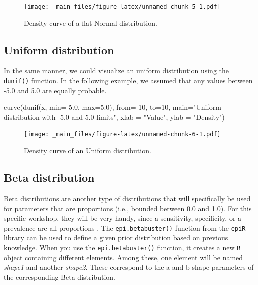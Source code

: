 \documentclass[
]{book}
\newenvironment{Shaded}{\begin{snugshade}}{\end{snugshade}}
\newcommand{\AttributeTok}[1]{\textcolor[rgb]{0.77,0.63,0.00}{#1}}
\newcommand{\DecValTok}[1]{\textcolor[rgb]{0.00,0.00,0.81}{#1}}
\newcommand{\FloatTok}[1]{\textcolor[rgb]{0.00,0.00,0.81}{#1}}
\newcommand{\FunctionTok}[1]{\textcolor[rgb]{0.00,0.00,0.00}{#1}}
\newcommand{\NormalTok}[1]{#1}
\newcommand{\SpecialCharTok}[1]{\textcolor[rgb]{0.00,0.00,0.00}{#1}}
\newcommand{\StringTok}[1]{\textcolor[rgb]{0.31,0.60,0.02}{#1}}
\begin{document}
\begin{figure}
\centering
\texttt{[image: \_main\_files/figure-latex/unnamed-chunk-5-1.pdf]}
\caption{Density curve of a flat Normal distribution.}
\end{figure}

\hypertarget{uniform-distribution}{%
\subsection{Uniform distribution}\label{uniform-distribution}}

In the same manner, we could visualize an uniform distribution using the
\texttt{dunif()} function. In the following example, we assumed that any
values between -5.0 and 5.0 are equally probable.

\begin{Shaded}
\begin{Highlighting}[]
\FunctionTok{curve}\NormalTok{(}\FunctionTok{dunif}\NormalTok{(x, }\AttributeTok{min=}\SpecialCharTok{{-}}\FloatTok{5.0}\NormalTok{, }\AttributeTok{max=}\FloatTok{5.0}\NormalTok{),                                    }
      \AttributeTok{from=}\SpecialCharTok{{-}}\DecValTok{10}\NormalTok{, }\AttributeTok{to=}\DecValTok{10}\NormalTok{,                                                 }
      \AttributeTok{main=}\StringTok{"Uniform distribution with {-}5.0 and 5.0 limits"}\NormalTok{,    }
      \AttributeTok{xlab =} \StringTok{"Value"}\NormalTok{, }\AttributeTok{ylab =} \StringTok{"Density"}\NormalTok{)                              }
\end{Highlighting}
\end{Shaded}

\begin{figure}
\centering
\texttt{[image: \_main\_files/figure-latex/unnamed-chunk-6-1.pdf]}
\caption{Density curve of an Uniform distribution.}
\end{figure}

\hypertarget{beta-distribution}{%
\subsection{Beta distribution}\label{beta-distribution}}

Beta distributions are another type of distributions that will
specifically be used for parameters that are proportions (i.e., bounded
between 0.0 and 1.0). For this specific workshop, they will be very
handy, since a sensitivity, specificity, or a prevalence are all
proportions . The \texttt{epi.betabuster()} function from the
\texttt{epiR} library can be used to define a given prior distribution
based on previous knowledge. When you use the \texttt{epi.betabuster()}
function, it creates a new \texttt{R} object containing different
elements. Among these, one element will be named \emph{shape1} and
another \emph{shape2}. These correspond to the a and b shape parameters
of the corresponding Beta distribution.
\end{document}
